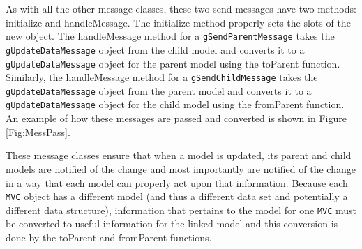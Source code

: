 \documentclass{article}[11pt]
\newcommand{\Rfunction}[1]{{\textsf{#1}}}
\newcommand{\Robject}[1]{{\texttt{#1}}}
\begin{document}
As with all the other message classes, these two send messages have
two methods: \Rfunction{initialize} and \Rfunction{handleMessage}.  The
\Rfunction{initialize} method properly sets the slots of the new object.  The
\Rfunction{handleMessage} method for a \Robject{gSendParentMessage}
takes the \Robject{gUpdateDataMessage} object from the child model
and converts it to a \Robject{gUpdateDataMessage} object for the parent
model using the \Rfunction{toParent} function.  Similarly, the
\Rfunction{handleMessage} method for a \Robject{gSendChildMessage} takes the
\Robject{gUpdateDataMessage} object from the parent model and
converts it to a \Robject{gUpdateDataMessage} object for the child
model using the \Rfunction{fromParent} function.  An example of how
these messages are passed and converted is shown in Figure \ref{Fig:MessPass}.

These message classes ensure that when a model is updated, its parent and
child models are notified of the change and most importantly are
notified of the change in a way that each model can properly act upon that
information.  Because each \Robject{MVC} object has a different model (and
thus a different data set and potentially a different data structure),
information that pertains to the model for one \Robject{MVC} must be converted
to useful information for the linked model and this conversion is done by the
\Rfunction{toParent} and \Rfunction{fromParent} functions.  
\end{document}
